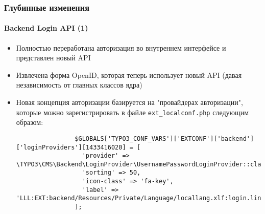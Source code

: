 \begin{frame}[fragile]
	\frametitle{Глубинные изменения}
	\framesubtitle{Backend Login API (1)}

	\lstset{basicstyle=\tiny\ttfamily}

	\begin{itemize}

		\item Полностью переработана авторизация во внутреннем интерфейсе и представлен новый API

		\item Извлечена форма OpenID, которая теперь использует новый API
			(давая независимость от главных классов ядра)

		\item Новая концепция авторизации базируется на "провайдерах авторизации", которые можно зарегистрировать
			в файле \texttt{ext\_localconf.php} следующим образом:

			\begin{lstlisting}
				$GLOBALS['TYPO3_CONF_VARS']['EXTCONF']['backend']['loginProviders'][1433416020] = [
				  'provider' => \TYPO3\CMS\Backend\LoginProvider\UsernamePasswordLoginProvider::class,
				  'sorting' => 50,
				  'icon-class' => 'fa-key',
				  'label' => 'LLL:EXT:backend/Resources/Private/Language/locallang.xlf:login.link'
				];
			\end{lstlisting}

	\end{itemize}

\end{frame}


